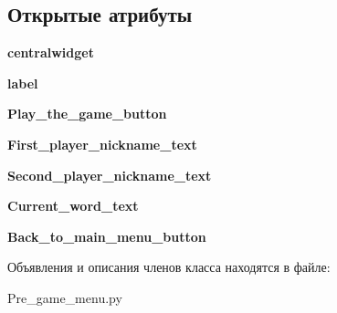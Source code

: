 \subsection*{Открытые атрибуты}
\begin{DoxyCompactItemize}
\item 
\mbox{\label{class_pre__game__menu_1_1_ui___main_window_adc378ee0c49c46aa41440ba54199acf5}} 
{\bfseries centralwidget}
\item 
\mbox{\label{class_pre__game__menu_1_1_ui___main_window_a0137c51a9c9cd42ed501e1e600ba043c}} 
{\bfseries label}
\item 
\mbox{\label{class_pre__game__menu_1_1_ui___main_window_abf98665567da102f129b0d3f2d350e61}} 
{\bfseries Play\+\_\+the\+\_\+game\+\_\+button}
\item 
\mbox{\label{class_pre__game__menu_1_1_ui___main_window_a3e1eaf0ae029dc0c822b401241305e45}} 
{\bfseries First\+\_\+player\+\_\+nickname\+\_\+text}
\item 
\mbox{\label{class_pre__game__menu_1_1_ui___main_window_ac3d7b93193278b030d8b9ca01ad73963}} 
{\bfseries Second\+\_\+player\+\_\+nickname\+\_\+text}
\item 
\mbox{\label{class_pre__game__menu_1_1_ui___main_window_ac382e14ce906b1be8c23064ef5c99a9c}} 
{\bfseries Current\+\_\+word\+\_\+text}
\item 
\mbox{\label{class_pre__game__menu_1_1_ui___main_window_a8158d61bc531afc480d50a86a91af606}} 
{\bfseries Back\+\_\+to\+\_\+main\+\_\+menu\+\_\+button}
\end{DoxyCompactItemize}


Объявления и описания членов класса находятся в файле\+:\begin{DoxyCompactItemize}
\item 
Pre\+\_\+game\+\_\+menu.\+py\end{DoxyCompactItemize}
